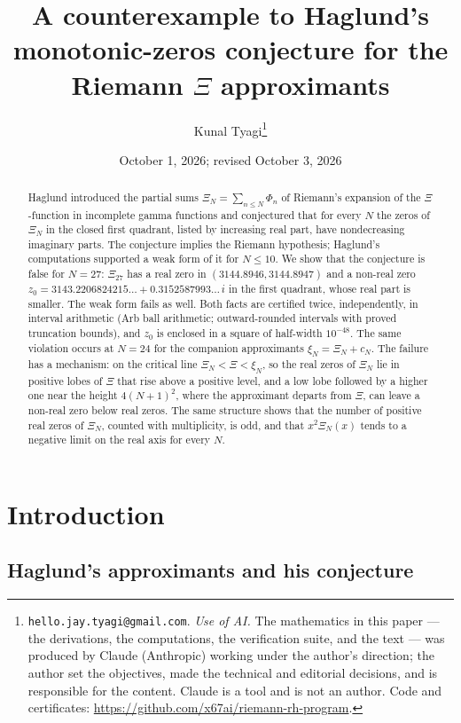 \documentclass[11pt]{article}
\title{A counterexample to Haglund's monotonic-zeros conjecture for the Riemann
$\Xi$ approximants}
\author{Kunal Tyagi\thanks{%
\texttt{hello.jay.tyagi@gmail.com}. \emph{Use of AI.} The mathematics in this
paper --- the derivations, the computations, the verification suite, and the
text --- was produced by Claude (Anthropic) working under the author's
direction; the author set the objectives, made the technical and editorial
decisions, and is responsible for the content. Claude is a tool and is not an
author. Code and certificates:
\url{https://github.com/x67ai/riemann-rh-program}.}}
\date{October 1, 2026; revised October 3, 2026}
\theoremstyle{plain}
\theoremstyle{definition}
\theoremstyle{remark}
\begin{document}
\maketitle

\begin{abstract}
Haglund introduced the partial sums $\Xi_N = \sum_{n \le N} \Phi_n$ of
Riemann's expansion of the $\Xi$-function in incomplete gamma functions and
conjectured that for every $N$ the zeros of $\Xi_N$ in the closed first
quadrant, listed by increasing real part, have nondecreasing imaginary parts.
The conjecture implies the Riemann hypothesis; Haglund's computations supported a
weak form of it for $N \le 10$. We show that the conjecture is false for
$N = 27$: $\Xi_{27}$ has a real zero in $(3144.8946, 3144.8947)$ and a non-real
zero $z_0 = 3143.2206824215\ldots + 0.3152587993\ldots\, i$ in the first
quadrant, whose real part is smaller. The weak form fails as well. Both facts
are certified twice, independently, in interval arithmetic (Arb ball
arithmetic; outward-rounded intervals with proved truncation bounds), and $z_0$
is enclosed in a square of half-width $10^{-48}$. The same violation occurs at
$N = 24$ for the companion approximants $\xi_N = \Xi_N + c_N$. The failure has a
mechanism: on the critical line $\Xi_N < \Xi < \xi_N$, so the real zeros of
$\Xi_N$ lie in positive lobes of $\Xi$ that rise above a positive level, and a
low lobe followed by a higher one near the height $4(N+1)^2$, where the
approximant departs from $\Xi$, can leave a non-real zero below real zeros. The same
structure shows that the number of positive real zeros of $\Xi_N$, counted with
multiplicity, is odd, and that $x^2\Xi_N(x)$ tends to a negative limit on the
real axis for every $N$.
\end{abstract}

\section{Introduction}
\label{sec:intro}

\subsection{Haglund's approximants and his conjecture}\label{sec:hag}
\end{document}
